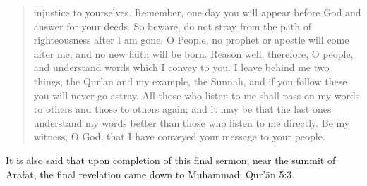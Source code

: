 \documentclass[fontsize=14pt, letterpaper, notitlepage, openany, DIV=12]{scrbook} %
\begin{document}
\begin{quotation}
  injustice to yourselves. Remember, one day you will appear before God and answer for
  your deeds. So beware, do not stray from the path of righteousness after I am gone. O
  People, no prophet or apostle will come after me, and no new faith will be born. Reason
  well, therefore, O people, and understand words which I convey to you. I leave behind
  me two things, the Qur'an and my example, the Sunnah, and if you follow these you will
  never go astray. All those who listen to me shall pass on my words to others and those to
  others again; and it may be that the last ones understand my words better than those who
  listen to me directly. Be my witness, O God, that I have conveyed your message to your
  people.
\end{quotation}

\noindent
It is also said that upon completion of this final sermon, near the summit of Arafat, the final
revelation came down to Muḥammad: Qur'ān 5:3.
\end{document}
